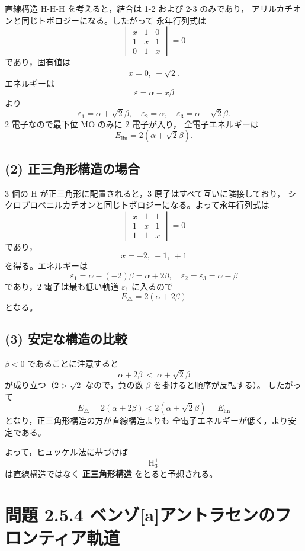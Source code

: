 \documentclass[a4paper,12pt]{jlreq}
\begin{document}
直線構造 H-H-H を考えると，結合は 1-2 および 2-3 のみであり，
アリルカチオンと同じトポロジーになる。したがって
永年行列式は
\[
\begin{vmatrix}
x & 1 & 0 \\
1 & x & 1 \\
0 & 1 & x
\end{vmatrix}=0
\]
であり，固有値は
\[
x = 0,\ \pm\sqrt{2}.
\]
エネルギーは
\[
\varepsilon = \alpha - x\beta
\]
より
\[
\varepsilon_1 = \alpha + \sqrt{2}\beta,\quad
\varepsilon_2 = \alpha,\quad
\varepsilon_3 = \alpha - \sqrt{2}\beta.
\]
2 電子なので最下位 MO のみに 2 電子が入り，
全電子エネルギーは
\[
E_{\mathrm{lin}} = 2(\alpha + \sqrt{2}\beta).
\]

\subsection*{(2) 正三角形構造の場合}

3 個の H が正三角形に配置されると，3 原子はすべて互いに隣接しており，
シクロプロペニルカチオンと同じトポロジーになる。よって永年行列式は
\[
\begin{vmatrix}
x & 1 & 1 \\
1 & x & 1 \\
1 & 1 & x
\end{vmatrix}=0
\]
であり，
\[
x = -2,\ +1,\ +1
\]
を得る。エネルギーは
\[
\varepsilon_1 = \alpha - (-2)\beta = \alpha + 2\beta,\quad
\varepsilon_2 = \varepsilon_3 = \alpha - \beta
\]
であり，2 電子は最も低い軌道 $\varepsilon_1$ に入るので
\[
E_{\triangle} = 2(\alpha + 2\beta)
\]
となる。

\subsection*{(3) 安定な構造の比較}

$\beta<0$ であることに注意すると
\[
\alpha + 2\beta\ <\ \alpha + \sqrt{2}\beta
\]
が成り立つ（$2 > \sqrt{2}$ なので，負の数 $\beta$ を掛けると順序が反転する）。
したがって
\[
E_{\triangle} = 2(\alpha + 2\beta)
             < 2(\alpha + \sqrt{2}\beta) = E_{\mathrm{lin}}
\]
となり，正三角形構造の方が直線構造よりも
全電子エネルギーが低く，より安定である。

よって，ヒュッケル法に基づけば
\[
\mathrm{H_3^+}
\]
は直線構造ではなく \textbf{正三角形構造} をとると予想される。

\newpage

\section*{問題 2.5.4 ベンゾ[a]アントラセンのフロンティア軌道}
\end{document}
